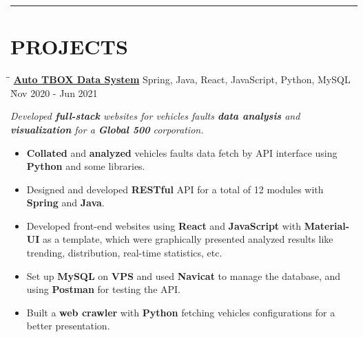 \documentclass{res}
\begin{document}
\begin{resume}
\vspace{+0.05in}

\vspace{-12pt}
\hspace{-0.55in}
\noindent\rule[0.25\baselineskip]{19.36cm}{0.5pt}    
        
\vspace{-0.2in}
\section{PROJECTS}

    \vspace{-0.05in}	 
    \begin{tabbing}
    \hspace{2.391in}\= \hspace{3in}\= \kill %
    \href{https://github.com/DolorHunter/AutoTBOXDataSystem}{\bf Auto TBOX Data System}  \> 
                Spring, Java, React, JavaScript, Python, MySQL \` Nov 2020 - Jun 2021 \\
    \end{tabbing}\vspace{-20pt}      %
    \vspace{-0.13in}
    \textit{Developed {\bf full-stack} websites for vehicles faults {\bf data analysis} and
             {\bf visualization} for a {\bf Global 500} corporation.}
    \vspace{-0.1in}
    \begin{itemize} \itemsep 0.5pt %
        \item {\bf Collated} and {\bf analyzed} vehicles faults data fetch by API interface using 
                {\bf Python} and some libraries.
        \item Designed and developed {\bf RESTful} API for a total of 12 modules with 
                {\bf Spring} and {\bf Java}.
        \item Developed front-end websites using {\bf React} and {\bf JavaScript} with 
                {\bf Material-UI} as a template, which were graphically presented analyzed results 
                like trending, distribution, real-time statistics, etc.
        \item Set up {\bf MySQL} on {\bf VPS} and used {\bf Navicat} to manage the database, and 
                using {\bf Postman} for testing the API.
        \item Built a {\bf web crawler} with {\bf Python} fetching vehicles configurations for 
                a better presentation.
    \end{itemize}


\end{resume}
\end{document}
